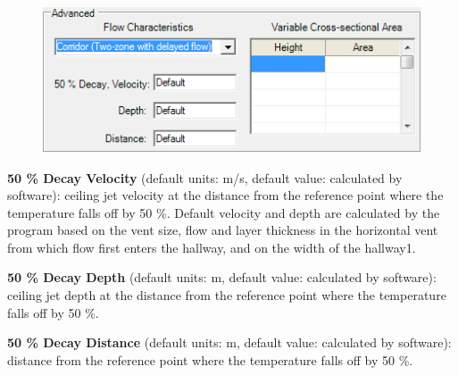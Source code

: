 \begin{figure}[h!]
\begin{center}
\includegraphics[width=4.5in]{FIGURES/Input_File/Corridor_Flow}
\end{center}
\end{figure}

\textbf{50 \% Decay Velocity} (default units: m/s, default value: calculated by software): ceiling jet velocity at the distance from the reference point where the temperature falls off by 50 \%. Default velocity and depth are calculated by the program based on the vent size, flow and layer thickness in the horizontal vent from which flow first enters the hallway, and on the width of the hallway1.

\textbf{50 \% Decay Depth} (default units: m, default value: calculated by software): ceiling jet depth at the distance from the reference point where the temperature falls off by 50 \%.

\textbf{50 \% Decay Distance} (default units: m, default value: calculated by software): distance from the reference point where the temperature falls off by 50 \%.

